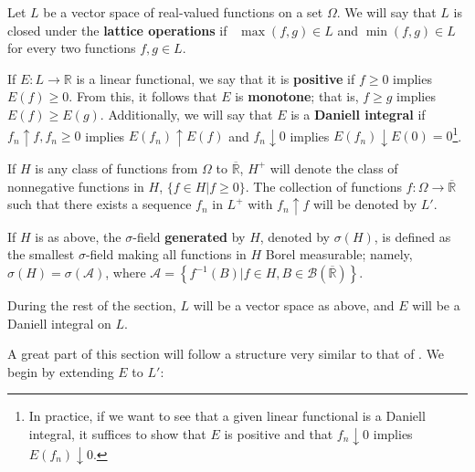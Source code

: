 \begin{defn}\label{definition:Daniell Theory}
		Let \(L\) be a vector space of real-valued functions on a set \(\Omega\). We will say that \(L\) is closed under the \textbf{lattice operations} if~ \(\max(f,g)\in L\) and \(\min(f,g)\in L\) for every two functions \(f,g\in L\).

		If \(E\colon L\to \mathbb{R} \) is a linear functional, we say that it is \textbf{positive} if \(f\geq 0\) implies \(E(f)\geq 0\). From this, it follows that \(E\) is \textbf{monotone}; that is, \(f\geq g\) implies \(E(f)\geq E(g)\). Additionally, we will say that \(E\) is a \textbf{Daniell integral} if \(f_n\uparrow f, f_n\geq 0\) implies \(E(f_n)\uparrow E(f)\) and \(f_n\downarrow 0\) implies \(E(f_n)\downarrow E(0)=0\)\footnote{In practice, if we want to see that a given linear functional is a Daniell integral, it suffices to show that \(E\) is positive and that \(f_n\downarrow 0\) implies \(E(f_n)\downarrow 0\).}.

		If \(H\) is any class of functions from \(\Omega\) to \(\overline{\mathbb{R}}\), \(H^{+}\) will denote the class of nonnegative functions in \(H\), \(\{f\in H\left|f\geq 0\right.\}\). The collection of functions \(f\colon \Omega\to \overline{\mathbb{R}} \) such that there exists a sequence \(f_n\) in \(L^{+}\) with \(f_n\uparrow f\) will be denoted by \(L'\).

		If \(H\) is as above, the \(\sigma\)-field \textbf{generated} by \(H\), denoted by \(\sigma(H)\), is defined as the smallest \(\sigma\)-field making all functions in \(H\) Borel measurable; namely, \(\sigma(H)=\sigma(\mathcal{A})\), where \(\mathcal{A}=\left\{f^{-1}(B)\left|f\in H, B\in\right.\mathscr{B}\left(\overline{\mathbb{R}}\right)\right\}\).
\end{defn}
During the rest of the section, \(L\) will be a vector space as above, and \(E\) will be a Daniell integral on \(L\).

A great part of this section will follow a structure very similar to that of . We begin by extending \(E\) to \(L'\):

